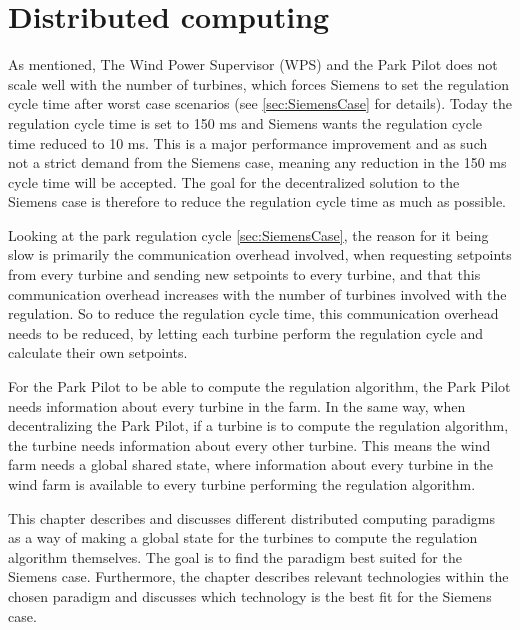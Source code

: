 \section{Distributed computing}

As mentioned, The Wind Power Supervisor (WPS) and the Park Pilot does not scale well with the number of turbines, which forces Siemens to set the regulation cycle time after worst case scenarios (see \cref{sec:SiemensCase} for details). Today the regulation cycle time is set to 150 ms and Siemens wants the regulation cycle time reduced to 10 ms. This is a major performance improvement and as such not a strict demand from the Siemens case, meaning any reduction in the 150 ms cycle time will be accepted. The goal for the decentralized solution to the Siemens case is therefore to reduce the regulation cycle time as much as possible.

Looking at the park regulation cycle \cref{sec:SiemensCase}, the reason for it being slow is primarily the communication overhead involved, when requesting setpoints from every turbine and sending new setpoints to every turbine, and that this communication overhead increases with the number of turbines involved with the regulation. So to reduce the regulation cycle time, this communication overhead needs to be reduced, by letting each turbine perform the regulation cycle and calculate their own setpoints. 


For the Park Pilot to be able to compute the regulation algorithm, the Park Pilot needs information about every turbine in the farm. In the same way, when decentralizing the Park Pilot, if a turbine is to compute the regulation algorithm, the turbine needs information about every other turbine. This means the wind farm needs a global shared state, where information about every turbine in the wind farm is available to every turbine performing the regulation algorithm. 


This chapter describes and discusses different distributed computing paradigms as a way of making a global state for the turbines to compute the regulation algorithm themselves. The goal is to find the paradigm best suited for the Siemens case. Furthermore, the chapter describes relevant technologies within the chosen paradigm and discusses which technology is the best fit for the Siemens case.

